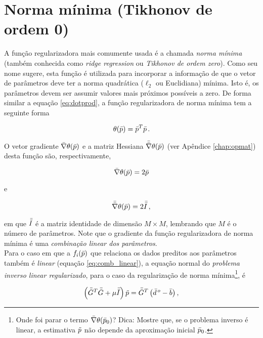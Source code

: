 \section{Norma mínima (Tikhonov de ordem 0)}

A função regularizadora mais comumente usada é a chamada {\it norma mínima}
(também conhecida como {\it ridge regression} ou {\it Tikhonov de ordem zero}).
Como seu nome sugere, esta função é utilizada para incorporar a informação de
que o vetor de parâmetros deve ter a norma quadrática ($\ell_2$ ou Euclidiana)
mínima.
Isto é, os parâmetros devem ser assumir valores mais próximos possíveis a zero.
De forma similar a equação \ref{eq:dotprod}, a função regularizadora de norma
mínima tem a seguinte forma

\begin{equation}
\theta(\bar{p}) = \bar{p}^T\bar{p} \thinspace .
\label{eq:norma_minima}
\end{equation}

\indent O vetor gradiente $\bar{\nabla}\theta(\bar{p})$ e a matriz Hessiana
$\bar{\bar{\nabla}}\theta(\bar{p})$ (ver Apêndice \ref{chap:opmat}) desta função
são, respectivamente,

\begin{equation}
\bar{\nabla}\theta(\bar{p}) = 2\bar{p}
\label{eq:grad_norma_minima}
\end{equation}

\noindent e

\begin{equation}
\bar{\bar{\nabla}}\theta(\bar{p}) = 2\bar{\bar{I}} \thinspace ,
\label{eq:hessian_norma_minima}
\end{equation}

\noindent em que $\bar{\bar{I}}$ é a matriz identidade de dimensão $M \times M$,
lembrando que $M$ é o número de parâmetros.
Note que o gradiente da função regularizadora de norma mínima é uma
{\it combinação linear dos parâmetros}.
\\
\indent Para o caso em que a $f_i(\bar{p})$ que relaciona
os dados preditos aos parâmetros também é {\it linear} (equação \ref{eq:comb_linear}),
a equação normal do {\it problema inverso linear regularizado},
para o caso da regularização de norma mínima\footnote{
Onde foi parar o termo $\bar{\nabla}\theta(\bar{p}_0)$? Dica: Mostre que, se o
problema inverso é linear, a estimativa $\tilde{p}$ não depende da aproximação
inicial $\bar{p}_0$.}, é

\begin{equation}
\left(\bar{\bar{G}}^T\bar{\bar{G}} + \mu\bar{\bar{I}}\right)\tilde{p} =
    \bar{\bar{G}}^T\left(\bar{d}^{\thinspace o} - \bar{b} \right) ,
\label{eq:sistema_normal_norma_min_linear}
\end{equation}

